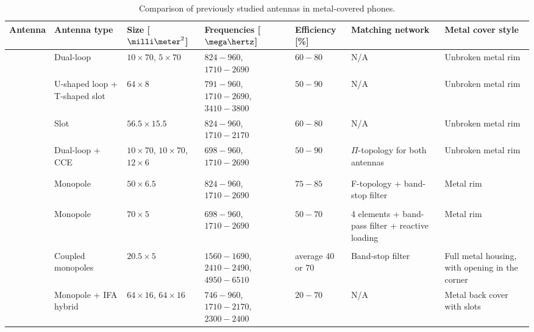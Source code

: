\begin{table}
\centering
\caption{Comparison of previously studied antennas in metal-covered phones.}
\begin{tabular}{|M{0.08\textheight}|M{0.13\textheight}|M{0.09\textheight}|M{0.15\textheight}|M{0.13\textheight}|M{0.14\textheight}|M{0.16\textheight}|}
    \hline
    \textbf{Antenna} & \textbf{Antenna type} & \textbf{Size [$\milli\meter^2$]} & \textbf{Frequencies [$\mega\hertz$]} & \textbf{Efficiency [\%]} & \textbf{Matching network} & \textbf{Metal cover style}\\
    \hline
    \cite{ban_dual_loop} & Dual-loop & $10\times70$, $5\times70$ & $824-960$, $1710-2690$ & $60-80$ & N/A & Unbroken metal rim\\
    \hline
    \cite{hsu_compact} & U-shaped loop + T-shaped slot & $64\times8$ & $791-960$, $1710-2690$, $3410-3800$ & $50-90$ & N/A & Unbroken metal rim\\
    \hline
    \cite{yuan_slot} & Slot & $56.5\times15.5$ & $824-960$, $1710-2170$ & $60-80$ & N/A & Unbroken metal rim\\
    \hline
    \cite{stanley_lte_mimo} & Dual-loop + CCE & $10\times70$, $10\times70$, $12\times6$ & $698-960$, $1710-2690$ & $50-90$ & $\Pi$-topology for both antennas & Unbroken metal rim\\
    \hline
    \cite{reconf_narrow} & & & & & & \\
    \hline
    \cite{hybrid} & & & & & & \\
    \hline
    \cite{lee_monopole} & Monopole & $50\times6.5$ & $824-960$, $1710-2690$ & $75-85$ & F-topology + band-stop filter & Metal rim\\
    \hline
    \cite{valkonen_multifeed} & & & & & & \\
    \hline
    \cite{chen_metal_frame} & Monopole & $70\times5$ & $698-960$, $1710-2690$ & $50-70$ & 4 elements + band-pass filter + reactive loading & Metal rim\\
    \hline
    \cite{hepta_ifa} & & & & & & \\
    \hline
    \cite{wu_pier} & Coupled monopoles & $20.5\times5$ & $1560-1690$, $2410-2490$, $4950-6510$ & average $40$ or $70$ & Band-stop filter & Full metal housing, with opening in the corner\\
    \hline
    \cite{son_wideband_mimo} & Monopole + IFA hybrid & $64\times16$, $64\times16$ & $746-960$, $1710-2170$, $2300-2400$ & $20-70$ & N/A & Metal back cover with slots\\

\end{tabular}
\end{table}
